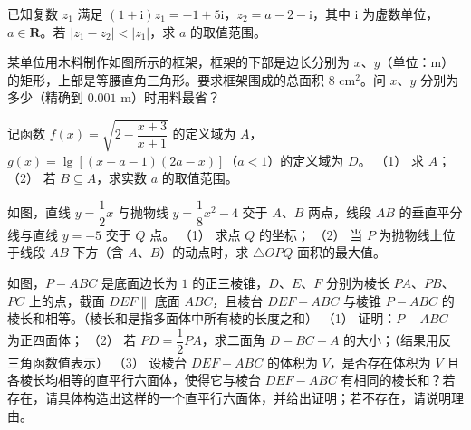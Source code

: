 \begin{question}
已知复数 $z_1$ 满足 $(1 + \mathrm{i})z_1 = -1 + 5\mathrm{i}$，$z_2 = a - 2 - \mathrm{i}$，其中 $\mathrm{i}$ 为虚数单位，$a \in \mathbf{R}$。若 $|z_1 - z_2| < |z_1|$，求 $a$ 的取值范围。

\Needspace{0.4\textheight}
\end{question}
\begin{question}
某单位用木料制作如图所示的框架，框架的下部是边长分别为 $x$、$y$（单位：$\mathrm{m}$）的矩形，上部是等腰直角三角形。要求框架围成的总面积 $8\text{ cm}^2$。问 $x$、$y$ 分别为多少（精确到 $0.001\text{ m}$）时用料最省？
\nopagebreak[4]
\begin{center}\end{center}
\nopagebreak[4]
\end{question}
\begin{question}
记函数 $f(x) = \sqrt{2 - \dfrac{x + 3}{x + 1}}$ 的定义域为 $A$，$g(x) = \lg[(x - a - 1)(2a - x)]$（$a < 1$）的定义域为 $D$。
（1） 求 $A$；
（2） 若 $B \subseteq A$，求实数 $a$ 的取值范围。

\Needspace{0.4\textheight}
\end{question}
\begin{question}
如图，直线 $y = \dfrac{1}{2}x$ 与抛物线 $y = \dfrac{1}{8}x^2 - 4$ 交于 $A$、$B$ 两点，线段 $AB$ 的垂直平分线与直线 $y = -5$ 交于 $Q$ 点。
（1） 求点 $Q$ 的坐标；
（2） 当 $P$ 为抛物线上位于线段 $AB$ 下方（含 $A$、$B$）的动点时，求 $\triangle OPQ$ 面积的最大值。
\nopagebreak[4]
\begin{center}\end{center}
\nopagebreak[4]
\Needspace{0.4\textheight}
\end{question}
\begin{question}
如图，$P - ABC$ 是底面边长为 $1$ 的正三棱锥，$D$、$E$、$F$ 分别为棱长 $PA$、$PB$、$PC$ 上的点，截面 $DEF \parallel$ 底面 $ABC$，且棱台 $DEF - ABC$ 与棱锥 $P - ABC$ 的棱长和相等。（棱长和是指多面体中所有棱的长度之和）
（1） 证明：$P - ABC$ 为正四面体；
（2） 若 $PD = \dfrac{1}{2}PA$，求二面角 $D - BC - A$ 的大小；（结果用反三角函数值表示）
（3） 设棱台 $DEF - ABC$ 的体积为 $V$，是否存在体积为 $V$ 且各棱长均相等的直平行六面体，使得它与棱台 $DEF - ABC$ 有相同的棱长和？若存在，请具体构造出这样的一个直平行六面体，并给出证明；若不存在，请说明理由。
\nopagebreak[4]
\begin{center}\end{center}
\nopagebreak[4]
\end{question}

